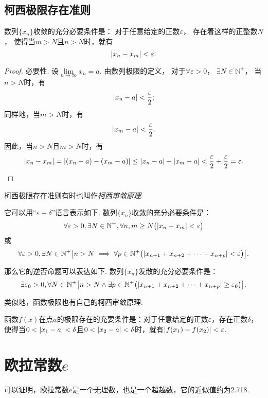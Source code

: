 \subsection{柯西极限存在准则}
\begin{theorem}[柯西极限存在准则]\label{theorem:极限.数列的柯西极限存在准则}
数列\(\{x_n\}\)收敛的充分必要条件是：
对于任意给定的正数\(\varepsilon\)，
存在着这样的正整数\(N\)，
使得当\(m>N\)且\(n>N\)时，就有\[
	\abs{x_n-x_m}<\varepsilon.
\]
\begin{proof}
必要性.
设\(\lim\limits_{n\to\infty}x_n = a\).
由数列极限的定义，
对于\(\forall\varepsilon>0\)，
\(\exists N \in \mathbb{N}^+\)，
当\(n > N\)时，有\[
	\abs{x_n - a} < \frac{\varepsilon}{2};
\]
同样地，当\(m > N\)时，有\[
	\abs{x_m - a} < \frac{\varepsilon}{2}.
\]
因此，当\(n > N\)且\(m > N\)时，有\[
	\abs{x_n - x_m} = \abs{(x_n - a) - (x_m - a)}
	\leq \abs{x_n - a} + \abs{x_m - a}
	< \frac{\varepsilon}{2} + \frac{\varepsilon}{2}
	= \varepsilon.
	\qedhere
\]
\end{proof}
\end{theorem}
柯西极限存在准则有时也叫作\emph{柯西审敛原理}.

它可以用“\(\varepsilon-\delta\)”语言表示如下.
数列\(\{x_n\}\)收敛的充分必要条件是：\[
\forall\varepsilon>0,
\exists N\in\mathbb{N}^+,
\forall n,m \geq N
\bigl(
	\abs{x_n-x_m}<\varepsilon
\bigr)
\]或\[
\forall\varepsilon>0,
\exists N\in\mathbb{N}^+
\bigl[
	n>N
	\implies
	\forall p\in\mathbb{N}^+
	\bigl(
		\abs{x_{n+1} + x_{n+2} + \dotsb + x_{n+p}} < \varepsilon
	\bigr)
\bigr].
\]

那么它的逆否命题可以表达如下.
数列\(\{x_n\}\)发散的充分必要条件是：\[
\exists\varepsilon_0>0,\forall N\in\mathbb{N}^+ \bigl[
	n > N
	\land
	\exists p\in\mathbb{N}^+ \bigl(
		\abs{x_{n+1} + x_{n+2} + \dotsb + x_{n+p}} \geq \varepsilon_0
	\bigr)
\bigr].
\]

类似地，函数极限也有自己的柯西审敛原理.
\begin{theorem}\label{theorem:极限.函数的柯西极限存在准则}
函数\(f(x)\)在点\(a\)的极限存在的充要条件是：对于任意给定的正数\(\varepsilon\)，存在正数\(\delta\)，使得当\(0 < \abs{x_1 - a} < \delta\)且\(0 < \abs{x_2 - a} < \delta\)时，就有\(\abs{f(x_1) - f(x_2)} < \varepsilon\).
\end{theorem}

\section{欧拉常数\texorpdfstring{\(e\)}{e}}
可以证明，欧拉常数\(e\)是一个无理数，也是一个超越数，它的近似值约为2.718.

